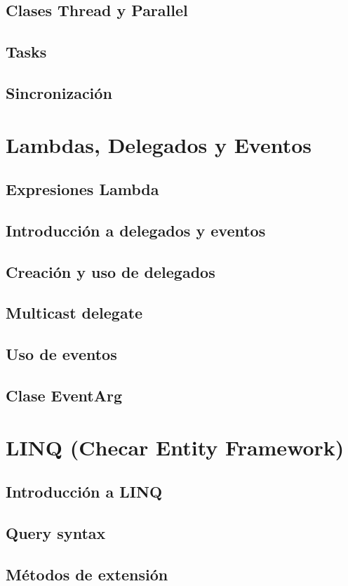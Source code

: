 \documentclass[12pt,a4paper]{report}
\begin{document}
\section{Clases Thread y Parallel}
\section{Tasks}
\section{Sincronización}

\chapter{Lambdas, Delegados y Eventos}
\section{Expresiones Lambda}
\section{Introducción a delegados y eventos}
\section{Creación y uso de delegados}
\section{Multicast delegate}
\section{Uso de eventos}
\section{Clase EventArg}

\chapter{LINQ (Checar Entity Framework)}
\section{Introducción a LINQ}
\section{Query syntax}
\section{Métodos de extensión}
\end{document}
